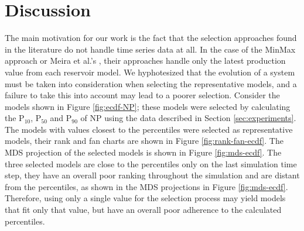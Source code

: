 \documentclass[final,5p,times,twocolumn]{elsarticle}
\begin{document}
\section{Discussion}
\label{sec:discussion}


The main motivation for our work is the fact that the selection approaches found in the literature do not handle time series data at all. In the case of the MinMax approach \cite{selection-sarma:2013} or Meira et al.'s \cite{meira:2016}, their approaches handle only the latest production value from each reservoir model. We hyphotesized that the evolution of a system must be taken into consideration when selecting the representative models, and a failure to take this into account may lead to a poorer selection. Consider the models shown in Figure \ref{fig:ecdf-NP}; these models were selected by calculating the P$_{10}$, P$_{50}$ and P$_{90}$ of NP using the data described in Section \ref{sec:experiments}. The models with values closest to the percentiles were selected as representative models, their rank and fan charts are shown in Figure \ref{fig:rank-fan-ecdf}. The MDS projection of the selected models is shown in Figure \ref{fig:mds-ecdf}. The three selected models are close to the percentiles only on the last simulation time step, they have an overall poor ranking throughout the simulation and are distant from the percentiles, as shown in the MDS projections in Figure \ref{fig:mds-ecdf}. Therefore, using only a single value for the selection process may yield models that fit only that value, but have an overall poor adherence to the calculated percentiles.
\end{document}
